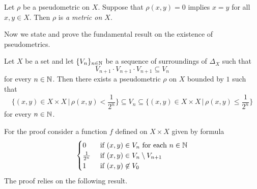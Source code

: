 \begin{definition}
Let $\rho$ be a pseudometric on $X$. Suppose that $\rho(x,y) = 0$ implies $x = y$ for all $x,y\in X$. Then $\rho$ is \textit{a metric on $X$}.
\end{definition}
\noindent
Now we state and prove the fundamental result on the existence of pseudometrics.

\begin{theorem}\label{theorem:Weils_theorem_on_pseudometrics}
Let $X$ be a set and let $\{V_n\}_{n\in {\mathbb N}}$ be a sequence of surroundings of $\Delta_X$ such that
$$V_{n+1}\cdot V_{n+1}\cdot V_{n+1} \subseteq V_n$$
for every $n\in {\mathbb N}$. Then there exists a pseudometric $\rho$ on $X$ bounded by $1$ such that
$$\bigg\{(x,y)\in X\times X\,\bigg|\,\rho(x,y)<\frac{1}{2^n}\bigg\} \subseteq V_n \subseteq \bigg\{(x,y)\in X\times X\,\bigg|\,\rho(x,y) \leq \frac{1}{2^n}\bigg\}$$
for every $n\in {\mathbb N}$.
\end{theorem}
\noindent
For the proof consider a function $f$ defined on $X\times X$ given by formula 
$$\begin{cases}
0 & \mbox{ if }(x,y)\in V_n\mbox{ for each }n\in {\mathbb N}\\
\frac{1}{2^n} & \mbox{ if }(x,y)\in V_n\setminus V_{n+1}\\
1 & \mbox{ if }(x,y)\not \in V_0
\end{cases}$$
The proof relies on the following result. 

